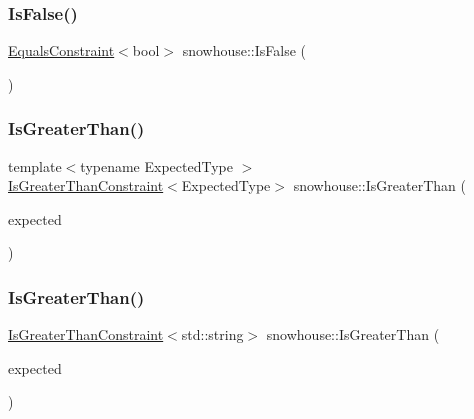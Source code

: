 \mbox{\label{namespacesnowhouse_a642a68e71efdb37e77e1eeaa96978b3b}} 
\subsubsection{\texorpdfstring{IsFalse()}{IsFalse()}}
{\footnotesize\ttfamily \mbox{\hyperlink{structsnowhouse_1_1EqualsConstraint}{Equals\+Constraint}}$<$bool$>$ snowhouse\+::\+Is\+False (\begin{DoxyParamCaption}{ }\end{DoxyParamCaption})\hspace{0.3cm}{\ttfamily [inline]}}

\mbox{\label{namespacesnowhouse_a80f7a2eb02ff7f4cedaa75d3a2c87f18}} 
\subsubsection{\texorpdfstring{IsGreaterThan()}{IsGreaterThan()}\hspace{0.1cm}{\footnotesize\ttfamily [1/2]}}
{\footnotesize\ttfamily template$<$typename Expected\+Type $>$ \\
\mbox{\hyperlink{structsnowhouse_1_1IsGreaterThanConstraint}{Is\+Greater\+Than\+Constraint}}$<$Expected\+Type$>$ snowhouse\+::\+Is\+Greater\+Than (\begin{DoxyParamCaption}\item[{const Expected\+Type \&}]{expected }\end{DoxyParamCaption})\hspace{0.3cm}{\ttfamily [inline]}}

\mbox{\label{namespacesnowhouse_ac0bbd15e81a1cb4bc6dbd5602293ae6a}} 
\subsubsection{\texorpdfstring{IsGreaterThan()}{IsGreaterThan()}\hspace{0.1cm}{\footnotesize\ttfamily [2/2]}}
{\footnotesize\ttfamily \mbox{\hyperlink{structsnowhouse_1_1IsGreaterThanConstraint}{Is\+Greater\+Than\+Constraint}}$<$std\+::string$>$ snowhouse\+::\+Is\+Greater\+Than (\begin{DoxyParamCaption}\item[{const char $\ast$}]{expected }\end{DoxyParamCaption})\hspace{0.3cm}{\ttfamily [inline]}}

